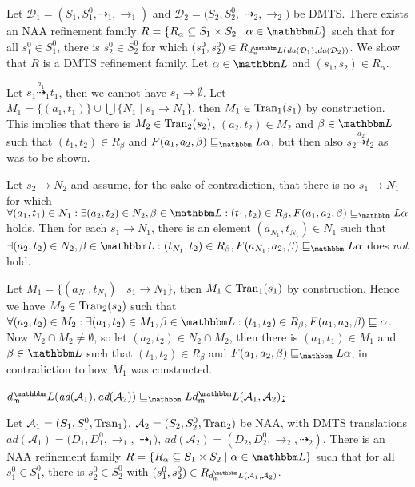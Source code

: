 \documentclass[twocolumn]{svjour3-dummy}
\newcommand*{\must}[1]{\overset{#1}{\longrightarrow}}
\newcommand*{\omust}{\mathord{\must{}}}
\newcommand*\cD{\mathcal D}
\newcommand*{\may}[1]{\overset{#1}{\dashrightarrow}}
\newcommand*{\omay}{\mathord{\may{}}}
\newcommand*\NAA{NAA\xspace}
\newcommand*\cA{\mathcal A}
\newcommand*\Tran{\textup{\textrm{Tran}}}
\newcommand*\db{\textit{da}} \newcommand*\bd{\textit{ad}} \newcommand*\bigmid{\mathrel{\big|}}
\newcommand*\LL{\mathbbm L}
\begin{document}
  Let $\cD_1=( S_1, S^0_1, \omay_1, \omust_1)$ and $\cD_2=( S_2, S^0_2,$
  $\omay_2, \omust_2)$ be DMTS.  There exists an \NAA refinement family
  $R=\{ R_\alpha\subseteq S_1\times S_2\mid \alpha\in \LL\}$ such that
  for all $s^0_1\in S^0_1$, there is $s^0_2\in S^0_2$ for which $( s^0_1,
  s^0_2)\in R_{ \mdl( \db( \cD_1), \db( \cD_2))}$.  We show that $R$ is
  a DMTS refinement family.  Let $\alpha\in \LL$ and $( s_1, s_2)\in
  R_\alpha$.

  Let $s_1\may{ a_1}_1 t_1$, then we cannot have $s_1\must{} \emptyset$.
  Let $M_1=\{( a_1, t_1)\}\cup \bigcup\{ N_1\mid s_1\must{} N_1\}$, then
  $M_1\in \Tran_1( s_1)$ by construction.  This implies that there is
  $M_2\in \Tran_2( s_2)$, $( a_2, t_2)\in M_2$ and $\beta\in \LL$ such
  that $( t_1, t_2)\in R_\beta$ and $F( a_1, a_2, \beta)\sqsubseteq_\LL
  \alpha$, but then also $s_2\may{ a_2} t_2$ as was to be shown.

  Let $s_2\must{} N_2$ and assume, for the sake of contradiction, that
  there is no $s_1\must{} N_1$ for which $\forall( a_1, t_1)\in N_1:
  \exists( a_2, t_2)\in N_2, \beta\in \LL:( t_1, t_2)\in R_\beta, F(
  a_1, a_2, \beta)\sqsubseteq_\LL \alpha$ holds.  Then for each
  $s_1\must{} N_1$, there is an element $( a_{ N_1}, t_{ N_1})\in N_1$
  such that $\exists( a_2, t_2)\in N_2, \beta\in \LL:( t_{ N_1}, t_2)\in
  R_\beta, F( a_{ N_1}, a_2, \beta)\sqsubseteq_\LL \alpha$ does
  \emph{not} hold.

  Let $M_1=\{( a_{ N_1}, t_{ N_1})\mid s_1\must{} N_1\}$, then $M_1\in
  \Tran_1( s_1)$ by construction.  Hence we have $M_2\in \Tran_2( s_2)$
  such that $\forall( a_2, t_2)\in M_2: \exists( a_1, t_2)\in M_1,
  \beta\in \LL:( t_1, t_2)\in R_\beta, F( a_1, a_2, \beta)\sqsubseteq
  \alpha$.  Now $N_2\cap M_2\ne \emptyset$, so let $( a_2, t_2)\in
  N_2\cap M_2$, then there is $( a_1, t_1)\in M_1$ and $\beta\in \LL$
  such that $( t_1, t_2)\in R_\beta$ and $F( a_1, a_2,
  \beta)\sqsubseteq_\LL \alpha$, in contradiction to how $M_1$ was
  constructed.

  \medskip \noindent \underline{$\mdl( \bd( \cA_1), \bd(
    \cA_2))\sqsubseteq_\LL \mdl( \cA_1, \cA_2)$:}

  Let $\cA_1=( S_1, S^0_1, \Tran_1)$, $\cA_2=( S_2, S^0_2, \Tran_2)$ be
  \NAA, with DMTS translations $\bd( \cA_1)=( D_1, D^0_1, \omust_1,$
  $\omay_1)$, $\bd( \cA_2)=( D_2, D^0_2, \omust_2, \omay_2)$.  There is
  an \NAA refinement family $R=\{ R_\alpha\subseteq S_1\times S_2\mid
  \alpha\in \LL\}$ such that for all $s^0_1\in S^0_1$, there is
  $s^0_2\in S^0_2$ with $( s^0_1, s^0_2)\in R_{ \mdl( \cA_1, \cA_2)}$.
\end{document}
